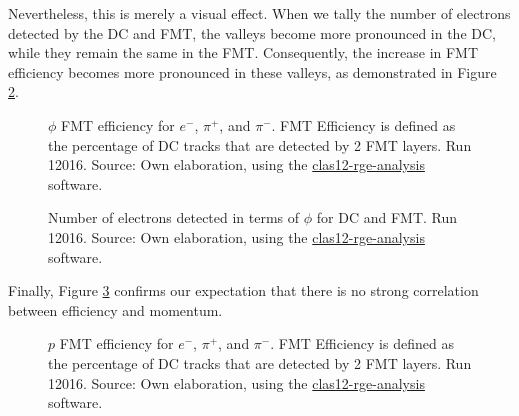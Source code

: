     Nevertheless, this is merely a visual effect.
    When we tally the number of electrons detected by the DC and FMT, the valleys become more pronounced in the DC, while they remain the same in the FMT.
    Consequently, the increase in FMT efficiency becomes more pronounced in these valleys, as demonstrated in Figure \ref{fig::14.14::phi_geomcut}.

    \begin{figure}[t!]
        \centering{}
        \caption[$\phi$ FMT efficiency for $e^-$, $\pi^+$, and $\pi^-$.
        Run 12016]{$\phi$ FMT efficiency for $e^-$, $\pi^+$, and $\pi^-$.
        FMT Efficiency is defined as the percentage of DC tracks that are detected by 2 FMT layers.
        Run 12016.
        Source: Own elaboration, using the \hyperlink{github.com/bleaktwig/clas12-rge-analysis}{clas12-rge-analysis} software.}
        \label{fig::14.14::fmt_efficiency_phi}
    \end{figure}

    \begin{figure}[t!]
        \centering{}
        \caption[Number of electrons detected in terms of $\phi$ for DC and FMT efficiencies for $e^-$.
        Run 12016]{Number of electrons detected in terms of $\phi$ for DC and FMT.
        Run 12016.
        Source: Own elaboration, using the \hyperlink{github.com/bleaktwig/clas12-rge-analysis}{clas12-rge-analysis} software.}
        \label{fig::14.14::phi_geomcut}
    \end{figure}

    Finally, Figure \ref{fig::14.14::fmt_efficiency_p} confirms our expectation that there is no strong correlation between efficiency and momentum.

    \begin{figure}[b!]
        \centering{}
        \caption[$p$ FMT efficiency for $e^-$, $\pi^+$, and $\pi^-$.
        Run 12016]{$p$ FMT efficiency for $e^-$, $\pi^+$, and $\pi^-$.
        FMT Efficiency is defined as the percentage of DC tracks that are detected by 2 FMT layers.
        Run 12016.
        Source: Own elaboration, using the \hyperlink{github.com/bleaktwig/clas12-rge-analysis}{clas12-rge-analysis} software.}
        \label{fig::14.14::fmt_efficiency_p}
    \end{figure}
